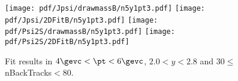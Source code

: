 \begin{figure}[H]
\begin{center}
\texttt{[image: pdf/Jpsi/drawmassB/n5y1pt3.pdf]}
\texttt{[image: pdf/Jpsi/2DFitB/n5y1pt3.pdf]}
\vspace*{-0.5cm}
\texttt{[image: pdf/Psi2S/drawmassB/n5y1pt3.pdf]}
\texttt{[image: pdf/Psi2S/2DFitB/n5y1pt3.pdf]}
\vspace*{-0.5cm}
\end{center}
\caption{Fit results in $4\gevc<\pt<6\gevc$, $2.0<y<2.8$ and 30$\leq$nBackTracks$<$80.}
\label{Fitn5y1pt3}
\end{figure}
